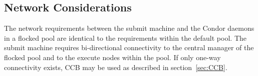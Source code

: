 \subsection{\label{sec:Flocking-Network}Network Considerations}

The network requirements between the submit machine and the Condor
daemons in a flocked pool are identical to the requirements within the
default pool.  The submit machine requires bi-directional connectivity
to the central manager of the flocked pool and to the execute nodes
within the pool.  If only one-way connectivity exists, CCB may be used
as described in section~\ref{sec:CCB}.
